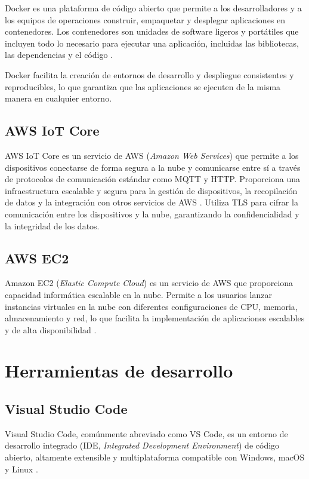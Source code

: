 Docker es una plataforma de código abierto que permite a los desarrolladores y
a los equipos de operaciones construir, empaquetar y desplegar aplicaciones en
contenedores. Los contenedores son unidades de software ligeros y portátiles
que incluyen todo lo necesario para ejecutar una aplicación, incluidas las
bibliotecas, las dependencias y el código \cite{Docker}.

Docker facilita la creación de entornos de desarrollo y despliegue consistentes
y reproducibles, lo que garantiza que las aplicaciones se ejecuten de la misma
manera en cualquier entorno.

\subsection{AWS IoT Core}

AWS IoT Core es un servicio de AWS (\textit{Amazon Web Services}) que permite a
los dispositivos conectarse de forma segura a la nube y comunicarse entre sí a
través de protocolos de comunicación estándar como MQTT y HTTP. Proporciona una
infraestructura escalable y segura para la gestión de dispositivos, la
recopilación de datos y la integración con otros servicios de AWS
\cite{AWS_IoT}. Utiliza TLS para cifrar la comunicación entre los dispositivos
y la nube, garantizando la confidencialidad y la integridad de los datos.

\subsection{AWS EC2}

Amazon EC2 (\textit{Elastic Compute Cloud}) es un servicio de AWS que
proporciona capacidad informática escalable en la nube. Permite a los usuarios
lanzar instancias virtuales en la nube con diferentes configuraciones de CPU,
memoria, almacenamiento y red, lo que facilita la implementación de
aplicaciones escalables y de alta disponibilidad \cite{AWS_EC2}.

\section{Herramientas de desarrollo}

\subsection{Visual Studio Code}

Visual Studio Code, comúnmente abreviado como VS Code, es un entorno de
desarrollo integrado (IDE, \textit{Integrated Development Environment}) de
código abierto, altamente extensible y multiplataforma compatible con Windows,
macOS y Linux \cite{VSCode}.

